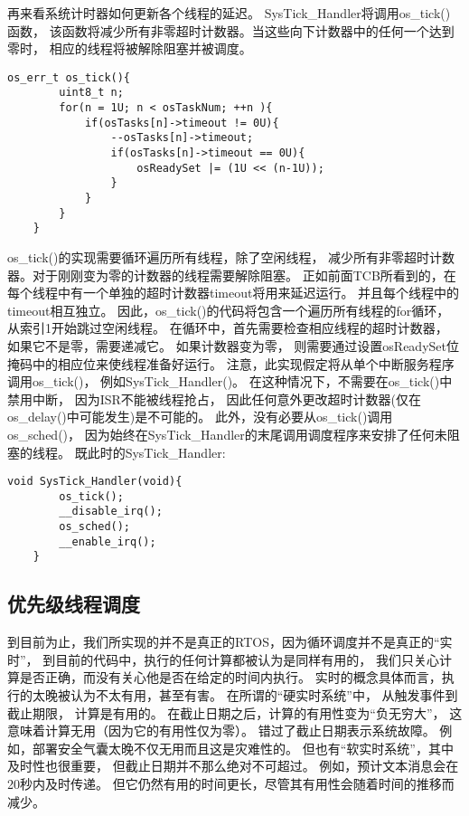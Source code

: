 再来看系统计时器如何更新各个线程的延迟。
SysTick\_Handler将调用os\_tick()函数，
该函数将减少所有非零超时计数器。当这些向下计数器中的任何一个达到零时，
相应的线程将被解除阻塞并被调度。
\begin{lstlisting}[language={[ANSI]C},keywordstyle=\color{blue!70},commentstyle=\color{red!50!green!50!blue!50},frame=shadowbox, rulesepcolor=\color{red!20!green!20!blue!20}]
    os_err_t os_tick(){
        uint8_t n;
        for(n = 1U; n < osTaskNum; ++n ){
            if(osTasks[n]->timeout != 0U){
                --osTasks[n]->timeout;
                if(osTasks[n]->timeout == 0U){
                    osReadySet |= (1U << (n-1U));
                }
            }
        }
    }
\end{lstlisting}
os\_tick()的实现需要循环遍历所有线程，除了空闲线程，
减少所有非零超时计数器。对于刚刚变为零的计数器的线程需要解除阻塞。
正如前面TCB所看到的，在每个线程中有一个单独的超时计数器timeout将用来延迟运行。
并且每个线程中的timeout相互独立。
因此，os\_tick()的代码将包含一个遍历所有线程的for循环，
从索引1开始跳过空闲线程。
在循环中，首先需要检查相应线程的超时计数器，
如果它不是零，需要递减它。
如果计数器变为零，
则需要通过设置osReadySet位掩码中的相应位来使线程准备好运行。
注意，此实现假定将从单个中断服务程序调用os\_tick()，
例如SysTick\_Handler()。
在这种情况下，不需要在os\_tick()中禁用中断，
因为ISR不能被线程抢占，
因此任何意外更改超时计数器(仅在os\_delay()中可能发生)是不可能的。
此外，没有必要从os\_tick()调用os\_sched()，
因为始终在SysTick\_Handler的末尾调用调度程序来安排了任何未阻塞的线程。
既此时的SysTick\_Handler:
\begin{lstlisting}[language={[ANSI]C},keywordstyle=\color{blue!70},commentstyle=\color{red!50!green!50!blue!50},frame=shadowbox, rulesepcolor=\color{red!20!green!20!blue!20}]
    void SysTick_Handler(void){
	    os_tick();
	    __disable_irq();
	    os_sched();
	    __enable_irq();
    }
\end{lstlisting}

\subsection{优先级线程调度}
到目前为止，我们所实现的并不是真正的RTOS，因为循环调度并不是真正的“实时”，
到目前的代码中，执行的任何计算都被认为是同样有用的，
我们只关心计算是否正确，而没有关心他是否在给定的时间内执行。
实时的概念具体而言，执行的太晚被认为不太有用，甚至有害。
在所谓的“硬实时系统”中，
从触发事件到截止期限，
计算是有用的。
在截止日期之后，计算的有用性变为“负无穷大”，
这意味着计算无用（因为它的有用性仅为零）。
错过了截止日期表示系统故障。
例如，部署安全气囊太晚不仅无用而且这是灾难性的。
但也有“软实时系统”，其中及时性也很重要，
但截止日期并不那么绝对不可超过。
例如，预计文本消息会在20秒内及时传递。
但它仍然有用的时间更长，尽管其有用性会随着时间的推移而减少。

